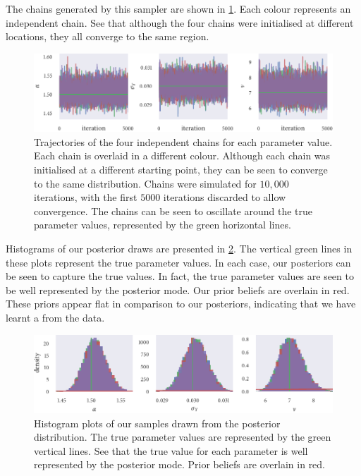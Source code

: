 The chains generated by this sampler are shown in \cref{fig:power_trace}. Each
colour represents an independent chain.  See that although the four chains were
initialised at different locations, they all converge to the same region.

\begin{figure}[p]
  \includegraphics{power_trace.pdf}
  \caption{Trajectories of the four independent chains for each parameter
    value. Each chain is overlaid in a different colour. Although each chain
    was initialised at a different starting point, they can be seen to
    converge to the same distribution. Chains were simulated for $10,000$
    iterations, with the first $5000$ iterations discarded to allow convergence.
    The chains can be seen to oscillate around the true parameter values,
    represented by the green horizontal lines.}
  \label{fig:power_trace}
\end{figure}

Histograms of our posterior draws are presented in \cref{fig:power_hist}. The
vertical green lines in these plots represent the true parameter values. In each case, our
posteriors can be seen to capture the true values. In fact, the true parameter values are
seen to be well represented by the posterior mode. Our prior beliefs are overlain in red.
These priors appear flat in comparison to our posteriors, indicating that we have learnt a
from the data.

\begin{figure}[p]
  \includegraphics{power_hist.pdf}
  \caption{Histogram plots of our samples drawn from the posterior distribution. The true
    parameter values are represented by the green vertical lines. See that the true value
    for each parameter is well represented by the posterior mode. Prior beliefs are overlain
    in red.}
  \label{fig:power_hist}
\end{figure}

